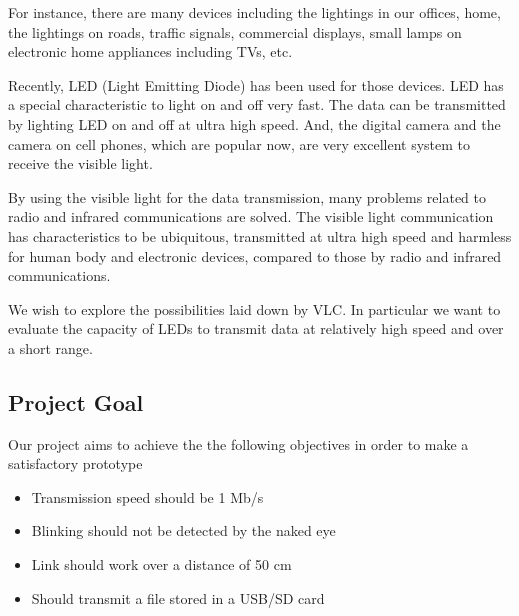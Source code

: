 \documentclass{article}
\begin{document}
For instance, there are many devices including the lightings in our offices, home, the lightings on roads, traffic signals, commercial displays, small lamps on electronic home appliances including TVs, etc. 

Recently, LED (Light Emitting Diode) has been used for those devices. LED has a special characteristic to light on and off very fast. The data can be transmitted by lighting LED on and off at ultra high speed. And, the digital camera and the camera on cell phones, which are popular now, are very excellent system to receive the visible light. 

By using the visible light for the data transmission, many problems related to radio and infrared communications are solved. The visible light communication has characteristics to be ubiquitous, transmitted at ultra high speed and harmless for human body and electronic devices, compared to those by radio and infrared communications.

We wish to explore the possibilities laid down by VLC. In particular we want to evaluate the capacity of LEDs to transmit data at relatively high speed and over a short range. 

\subsection{Project Goal}

Our project aims to achieve the the following objectives in order to make a satisfactory prototype
\begin{itemize}
\item Transmission speed should be 1 Mb/s
\item Blinking should not be detected by the naked eye
\item Link should work over a distance of 50 cm
\item Should transmit a file stored in a USB/SD card 
\end{itemize}
\end{document}
